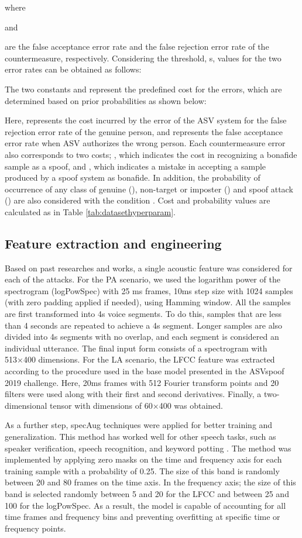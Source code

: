 \documentclass[a4paper]{article}
\begin{document}
where
 
and
 
are the false acceptance error rate and the false rejection error rate of the countermeasure, respectively. Considering the threshold, s, values for the two error rates can be obtained as follows:

The two constants  and  represent the predefined cost for the errors, which are determined based on prior probabilities as shown below:

Here,  represents the cost incurred by the error of the ASV system for the false rejection error rate of the genuine person, and  represents the false acceptance error rate when ASV authorizes the wrong person. Each countermeasure error also corresponds to two costs; , which indicates the cost in recognizing a bonafide sample as a spoof, and , which indicates a mistake in accepting a sample produced by a spoof system as bonafide. In addition, the probability of occurrence of any class of genuine (), non-target or imposter () and spoof attack () are also considered with the condition . Cost and probability values are calculated as in Table \ref{tab:datasethyperparam}.
\subsection{Feature extraction and engineering}
Based on past researches and works, a single acoustic feature was considered for each of the attacks. For the PA scenario, we used the logarithm power of the spectrogram (logPowSpec) with 25 ms frames, 10ms step size with 1024 samples (with zero padding applied if needed), using Hamming window. All the samples are first transformed into 4s voice segments. To do this, samples that are less than 4 seconds are repeated to achieve a 4s segment. Longer samples are also divided into 4s segments with no overlap, and each segment is considered an individual utterance. The final input form consists of a spectrogram with 513×400 dimensions. For the LA scenario, the LFCC feature was extracted according to the procedure used in the base model presented in the ASVspoof 2019 challenge. Here, 20ms frames with 512 Fourier transform points and 20 filters were used along with their first and second derivatives. Finally, a two-dimensional tensor with dimensions of 60×400 was obtained. 

As a further step, specAug \cite{26park2019specaugment} techniques were applied for better training and generalization. This method has worked well for other speech tasks, such as speaker verification, speech recognition, and keyword potting \cite{21rostami2020efficientnet}. The method was implemented by applying zero masks on the time and frequency axis for each training sample with a probability of 0.25. The size of this band is randomly between 20 and 80 frames on the time axis. In the frequency axis; the size of this band is selected randomly between 5 and 20 for the LFCC and between 25 and 100 for the logPowSpec. As a result, the model is capable of accounting for all time frames and frequency bins and preventing overfitting at specific time or frequency points.
\end{document}
